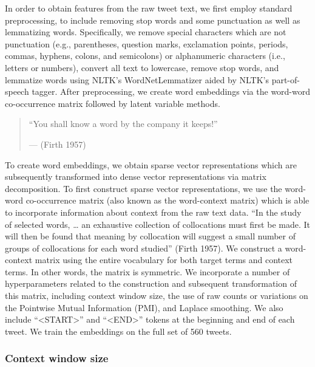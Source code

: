\documentclass{article}
\begin{document}
In order to obtain features from the raw tweet text, we first employ
standard preprocessing, to include removing stop words and some
punctuation as well as lemmatizing words. Specifically, we remove
special characters which are not punctuation (e.g., parentheses,
question marks, exclamation points, periods, commas, hyphens, colons,
and semicolons) or alphanumeric characters (i.e., letters or numbers),
convert all text to lowercase, remove stop words, and lemmatize words
using NLTK's WordNetLemmatizer aided by NLTK's part-of-speech tagger.
After preprocessing, we create word embeddings via the word-word
co-occurrence matrix followed by latent variable methods.

\begin{quote}
``You shall know a word by the company it keeps!''

--- (Firth 1957)
\end{quote}

To create word embeddings, we obtain sparse vector representations which
are subsequently transformed into dense vector representations via
matrix decomposition. To first construct sparse vector representations,
we use the word-word co-occurrence matrix (also known as the
word-context matrix) which is able to incorporate information about
context from the raw text data. ``In the study of selected words,
\ldots{} an exhaustive collection of collocations must first be made. It
will then be found that meaning by collocation will suggest a small
number of groups of collocations for each word studied'' (Firth 1957).
We construct a word-context matrix using the entire vocabulary for both
target terms and context terms. In other words, the matrix is symmetric.
We incorporate a number of hyperparameters related to the construction
and subsequent transformation of this matrix, including context window
size, the use of raw counts or variations on the Pointwise Mutual
Information (PMI), and Laplace smoothing. We also include
``\textless START\textgreater{}'' and ``\textless END\textgreater{}''
tokens at the beginning and end of each tweet. We train the embeddings
on the full set of 560 tweets.

\hypertarget{context-window-size}{%
\subsubsection{Context window size}\label{context-window-size}}
\end{document}
